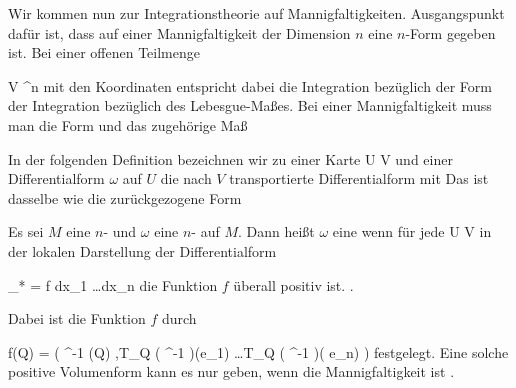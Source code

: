 \setcounter{section}{15}

Wir kommen nun zur Integrationstheorie auf Mannigfaltigkeiten. Ausgangspunkt dafür ist, dass auf einer Mannigfaltigkeit der Dimension $n$ eine $n$-Form gegeben ist. Bei einer offenen Teilmenge

\mavergleichskette
{\vergleichskette
{ V
}
{ \subseteq }{ \R^n
}
{  }{
}
{    }{
}
{   }{
}
}
{}{}{}
mit den Koordinaten
 entspricht dabei die Integration bezüglich der Form
 der Integration bezüglich des Lebesgue-Maßes. Bei einer Mannigfaltigkeit muss man die Form und das zugehörige Maß 


In der folgenden Definition bezeichnen wir zu einer Karte
\maabb {\alpha} { U } { V
} {}
und einer Differentialform $\omega$ auf $U$ die nach $V$ transportierte Differentialform mit
 Das ist dasselbe wie die zurückgezogene Form

{}
{

Es sei $M$ eine
$n$-
und $\omega$ eine
$n$-
auf $M$. Dann heißt $\omega$ eine  wenn für jede
 {} {}
\maabbdisp {\alpha} { U } { V
} {}
 {} {}
in der lokalen Darstellung der Differentialform

\mavergleichskettedisp
{\vergleichskette
{ \alpha_* \omega
}
{ =} { f dx_1 \wedge \ldots \wedge dx_n
}
{ } {
}
{ } {
}
{ } {
}
}
{}{}{}
die Funktion $f$ überall positiv ist. {.} {}

}
Dabei ist die Funktion $f$ durch

\mavergleichskettedisphandlinks
{\vergleichskettedisphandlinks
{ f(Q)
}
{ =} { \omega \left(  \alpha^{-1} (Q) ,T_Q \left(  \alpha^{-1}  \right)(e_1) \wedge \ldots \wedge T_Q \left(  \alpha^{-1}  \right)( e_n)  \right)
}
{ } {
}
{ } {
}
{ } {
}
}
{}{}{}
festgelegt. Eine solche positive Volumenform kann es nur geben, wenn die Mannigfaltigkeit
ist
 {} {.}

